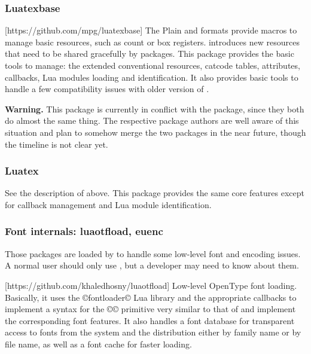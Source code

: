 \documentclass{lltxdoc}
\begin{document}
\subsubsection{Luatexbase}

[https://github.com/mpg/luatexbase]
The Plain and \latex formats provide macros to manage \tex basic resources,
such as count or box registers. \luatex introduces new resources that need to
be shared gracefully by packages. This package provides the basic tools to
manage: the extended conventional \tex resources, catcode tables, attributes,
callbacks, Lua modules loading and identification. It also provides basic
tools to handle a few compatibility issues with older version of \luatex.

\textbf{Warning.} This package is currently in conflict with the 
package, since they both do almost the same thing. The respective package
authors are well aware of this situation and plan to somehow merge the two
packages in the near future, though the timeline is not clear yet.

\subsubsection{Luatex}

See the description of  above. This package provides the same
core features except for callback management and Lua module identification.

\subsubsection{Font internals: luaotfload, euenc}\label{fontint}

Those packages are loaded by  to handle some low-level font and
encoding issues. A normal user should only use , but a developer
may need to know about them.

\medskip
{}[https://github.com/khaledhosny/luaotfload]
Low-level OpenType font loading. Basically, it uses the ©fontloader© Lua
library and the appropriate callbacks to implement a syntax for the ©\font©
primitive very similar to that of \xetex and implement the corresponding font
features. It also handles a font database for transparent access to fonts from
the system and the \tex distribution either by family name or by file name, as
well as a font cache for faster loading.
\end{document}
